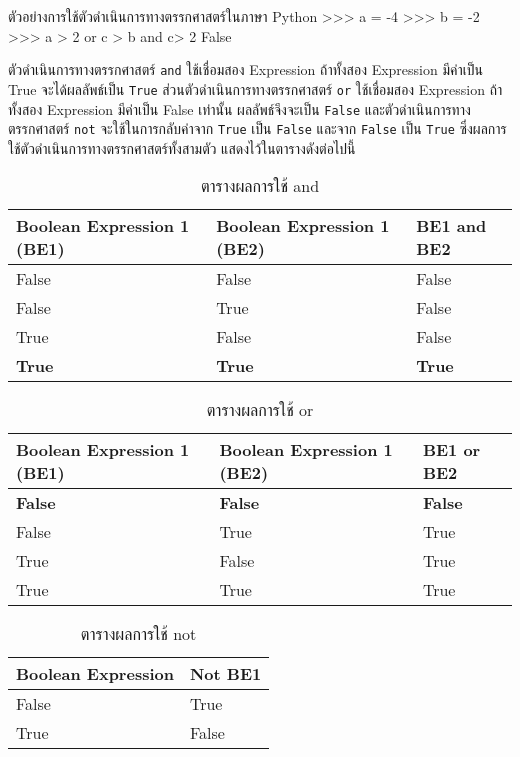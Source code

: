 \begin{codelist}{ตัวอย่างการใช้ตัวดำเนินการทางตรรกศาสตร์ในภาษา Python}{}
>>> a = -4
>>> b = -2
>>> a > 2 or c > b and c> 2
False
\end{codelist}

ตัวดำเนินการทางตรรกศาสตร์  \texttt{and} ใช้เชื่อมสอง Expression ถ้าทั้งสอง Expression มีค่าเป็น True จะได้ผลลัพธ์เป็น \texttt{True}  ส่วนตัวดำเนินการทางตรรกศาสตร์ \texttt{or} ใช้เชื่อมสอง Expression ถ้าทั้งสอง Expression มีค่าเป็น False เท่านั้น ผลลัพธ์จึงจะเป็น \texttt{False} และตัวดำเนินการทางตรรกศาสตร์ \texttt{not} จะใช้ในการกลับค่าจาก \texttt{True} เป็น \texttt{False} และจาก \texttt{False} เป็น \texttt{True} ซึ่งผลการใช้ตัวดำเนินการทางตรรกศาสตร์ทั้งสามตัว แสดงไว้ในตารางดังต่อไปนี้

\begin{table}
\caption{ตารางผลการใช้ and}
\centering
\begin{tabu}{l l l}
 \hline
Boolean Expression 1 (BE1) & Boolean Expression 1 (BE2) & BE1 and BE2  \\ [0.5ex] 
 \hline
False & False & False \\
False & True & False  \\
True & False & False \\
\textbf{True} & \textbf{True} & \textbf{True} \\
\end{tabu}
\end{table}

\begin{table}
\caption{ตารางผลการใช้ or}
\centering
\begin{tabu}{l l l}
 \hline
Boolean Expression 1 (BE1) & Boolean Expression 1 (BE2) & BE1 or BE2  \\ [0.5ex] 
 \hline
\textbf{False} & \textbf{False} & \textbf{False} \\
False & True & True  \\
True & False & True \\
True & True & True \\
\end{tabu}
\end{table}

\begin{table}
\caption{ตารางผลการใช้ not}
\centering
\begin{tabu}{l l}
 \hline
 Boolean Expression & Not BE1  \\ [0.5ex] 
 \hline
False & True \\
True & False \\
\end{tabu}
\end{table}

